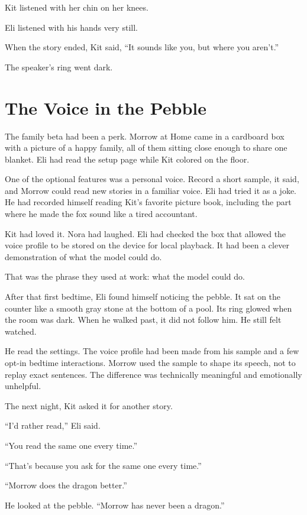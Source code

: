 \documentclass[11pt,openany]{book}
\begin{document}
Kit listened with her chin on her knees.

Eli listened with his hands very still.

When the story ended, Kit said, ``It sounds like you, but where you aren't.''

The speaker's ring went dark.

\chapter{The Voice in the Pebble}

The family beta had been a perk. Morrow at Home came in a cardboard box with a picture of a happy family, all of them sitting close enough to share one blanket. Eli had read the setup page while Kit colored on the floor.

One of the optional features was a personal voice. Record a short sample, it said, and Morrow could read new stories in a familiar voice. Eli had tried it as a joke. He had recorded himself reading Kit's favorite picture book, including the part where he made the fox sound like a tired accountant.

Kit had loved it. Nora had laughed. Eli had checked the box that allowed the voice profile to be stored on the device for local playback. It had been a clever demonstration of what the model could do.

That was the phrase they used at work: what the model could do.

After that first bedtime, Eli found himself noticing the pebble. It sat on the counter like a smooth gray stone at the bottom of a pool. Its ring glowed when the room was dark. When he walked past, it did not follow him. He still felt watched.

He read the settings. The voice profile had been made from his sample and a few opt-in bedtime interactions. Morrow used the sample to shape its speech, not to replay exact sentences. The difference was technically meaningful and emotionally unhelpful.

The next night, Kit asked it for another story.

``I'd rather read,'' Eli said.

``You read the same one every time.''

``That's because you ask for the same one every time.''

``Morrow does the dragon better.''

He looked at the pebble. ``Morrow has never been a dragon.''
\end{document}
